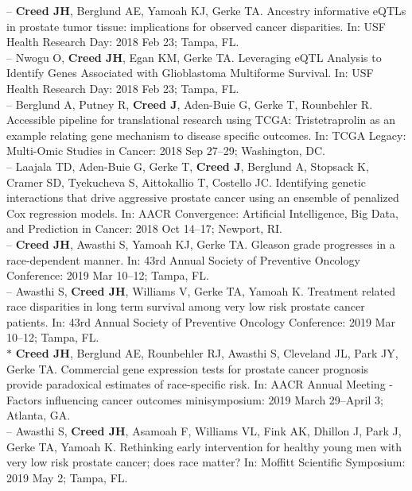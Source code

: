 \documentclass[11pt, a4paper]{article} %
\begin{document}
-- {\bf Creed JH}, Berglund AE, Yamoah KJ, Gerke TA. Ancestry informative eQTLs in prostate tumor tissue: implications for observed cancer disparities. In: USF Health Research Day: 2018 Feb 23; Tampa, FL. \\

-- Nwogu O, {\bf Creed JH}, Egan KM, Gerke TA. Leveraging eQTL Analysis to Identify Genes Associated with Glioblastoma Multiforme Survival. In: USF Health Research Day: 2018 Feb 23; Tampa, FL. \\

-- Berglund A, Putney R, {\bf Creed J}, Aden-Buie G, Gerke T, Rounbehler R. Accessible pipeline for translational research using TCGA: Tristetraprolin as an example relating gene mechanism to disease specific outcomes. In: TCGA Legacy: Multi-Omic Studies in Cancer: 2018 Sep 27--29; Washington, DC.\\

-- Laajala TD, Aden-Buie G, Gerke T, {\bf Creed J}, Berglund A, Stopsack K, Cramer SD, Tyekucheva S, Aittokallio T, Costello JC. Identifying genetic interactions that drive aggressive prostate cancer using an ensemble of penalized Cox regression models.  In: AACR Convergence: Artificial Intelligence, Big Data, and Prediction in Cancer: 2018 Oct 14--17; Newport, RI. \\

-- {\bf Creed JH}, Awasthi S, Yamoah KJ, Gerke TA. Gleason grade progresses in a race-dependent manner. In: 43rd Annual Society of Preventive Oncology Conference: 2019 Mar 10--12; Tampa, FL. \\

-- Awasthi S, {\bf Creed JH}, Williams V, Gerke TA, Yamoah K. Treatment related race disparities in long term survival among very low risk prostate cancer patients. In: 43rd Annual Society of Preventive Oncology Conference: 2019 Mar 10--12; Tampa, FL. \\

$*$ {\bf Creed JH}, Berglund AE, Rounbehler RJ, Awasthi S, Cleveland JL, Park JY, Gerke TA. Commercial gene expression tests for prostate cancer prognosis provide  paradoxical estimates of race-specific risk. In: AACR Annual Meeting - Factors influencing cancer outcomes minisymposium: 2019 March 29--April 3; Atlanta, GA. \\

-- Awasthi S, {\bf Creed JH}, Asamoah F, Williams VL, Fink AK, Dhillon J, Park J, Gerke TA, Yamoah K. Rethinking early intervention for healthy young men with very low risk prostate cancer; does race matter? In: Moffitt Scientific Symposium: 2019 May 2; Tampa, FL. \\
\end{document}
